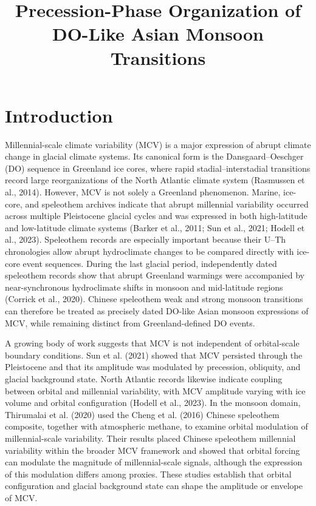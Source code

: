 \documentclass[11pt]{article}
\title{Precession-Phase Organization of DO-Like Asian Monsoon Transitions}
\author{}
\date{}
\begin{document}
\maketitle

\section*{Introduction}

Millennial-scale climate variability (MCV) is a major expression of abrupt climate change in glacial climate systems. Its canonical form is the Dansgaard--Oeschger (DO) sequence in Greenland ice cores, where rapid stadial--interstadial transitions record large reorganizations of the North Atlantic climate system (Rasmussen et al., 2014). However, MCV is not solely a Greenland phenomenon. Marine, ice-core, and speleothem archives indicate that abrupt millennial variability occurred across multiple Pleistocene glacial cycles and was expressed in both high-latitude and low-latitude climate systems (Barker et al., 2011; Sun et al., 2021; Hodell et al., 2023). Speleothem records are especially important because their U--Th chronologies allow abrupt hydroclimate changes to be compared directly with ice-core event sequences. During the last glacial period, independently dated speleothem records show that abrupt Greenland warmings were accompanied by near-synchronous hydroclimate shifts in monsoon and mid-latitude regions (Corrick et al., 2020). Chinese speleothem weak and strong monsoon transitions can therefore be treated as precisely dated DO-like Asian monsoon expressions of MCV, while remaining distinct from Greenland-defined DO events.

A growing body of work suggests that MCV is not independent of orbital-scale boundary conditions. Sun et al. (2021) showed that MCV persisted through the Pleistocene and that its amplitude was modulated by precession, obliquity, and glacial background state. North Atlantic records likewise indicate coupling between orbital and millennial variability, with MCV amplitude varying with ice volume and orbital configuration (Hodell et al., 2023). In the monsoon domain, Thirumalai et al. (2020) used the Cheng et al. (2016) Chinese speleothem composite, together with atmospheric methane, to examine orbital modulation of millennial-scale variability. Their results placed Chinese speleothem millennial variability within the broader MCV framework and showed that orbital forcing can modulate the magnitude of millennial-scale signals, although the expression of this modulation differs among proxies. These studies establish that orbital configuration and glacial background state can shape the amplitude or envelope of MCV.
\end{document}
